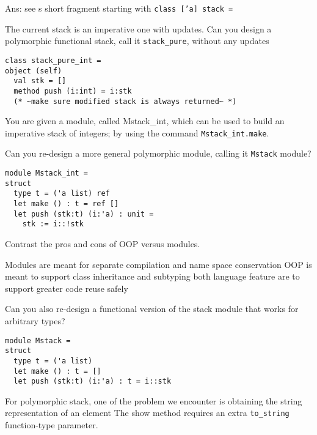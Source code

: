 \documentclass[fontsize=10pt]{slnotes}
\begin{document}
   Ans: see s short fragment starting with
       \texttt{class ['a] stack =}

The current stack is an imperative one with updates.
    Can you design a polymorphic functional stack, call
    it \texttt{stack\_pure}, without any updates

\begin{lstlisting}[escapechar=\~,escapebegin=\rmfamily,language={[Objective]Caml}]
class stack_pure_int =
object (self)
  val stk = []
  method push (i:int) = i:stk
  (* ~make sure modified stack is always returned~ *)
\end{lstlisting}

You are given a module, called Mstack\_int, which can be
    used to build an imperative stack of integers; by using
     the command \texttt{Mstack\_int.make}.

    Can you re-design a more general polymorphic module,
    calling it \texttt{Mstack} module?
\begin{lstlisting}[escapechar=\~,escapebegin=\rmfamily,language={[Objective]Caml}]
module Mstack_int =
struct
  type t = ('a list) ref
  let make () : t = ref []
  let push (stk:t) (i:'a) : unit =
    stk := i::!stk
\end{lstlisting}

    Contrast the pros and cons of OOP versus modules.

Modules are meant for separate compilation and name space conservation
OOP is meant to support class inheritance and subtyping
both language feature are to support greater code reuse safely

Can you also re-design a functional version of the
    stack module that works for arbitrary types?

\begin{lstlisting}[escapechar=\~,escapebegin=\rmfamily,language={[Objective]Caml}]
module Mstack =
struct
  type t = ('a list)
  let make () : t = []
  let push (stk:t) (i:'a) : t = i::stk
\end{lstlisting}

For polymorphic stack, one of the problem we encounter
    is obtaining the string representation of an element
    The show method requires an extra \texttt{to\_string} function-type
    parameter.
\end{document}
